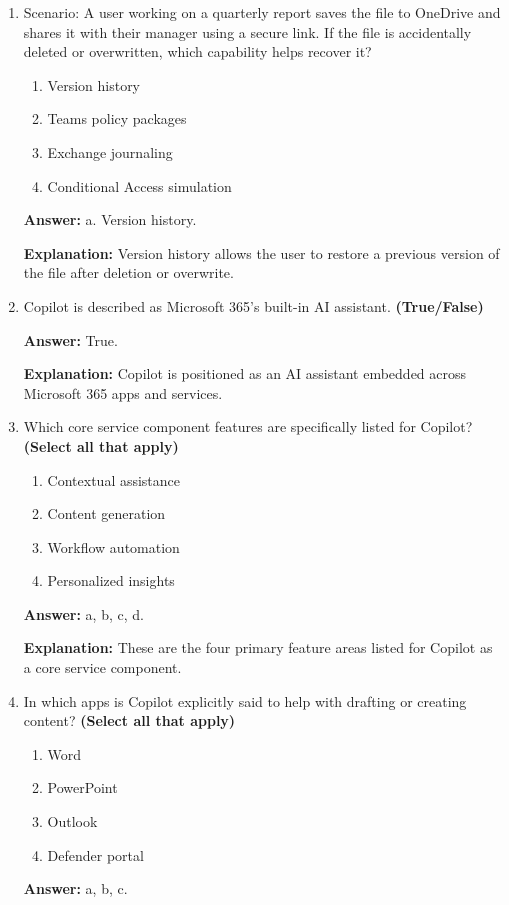 \documentclass[10pt]{article}
\begin{document}
\begin{enumerate}[leftmargin=*]
\textbf{Explanation:} OneDrive sharing can be constrained using permission levels, expirations, and password-protected links.

\item Scenario: A user working on a quarterly report saves the file to OneDrive and shares it with their manager using a secure link. If the file is accidentally deleted or overwritten, which capability helps recover it?
\begin{enumerate}[label=\alph*., leftmargin=1.5em]
\item Version history
\item Teams policy packages
\item Exchange journaling
\item Conditional Access simulation
\end{enumerate}
\textbf{Answer:} a. Version history.

\textbf{Explanation:} Version history allows the user to restore a previous version of the file after deletion or overwrite.

\item Copilot is described as Microsoft 365’s built-in AI assistant. \textbf{(True/False)}

\textbf{Answer:} True.

\textbf{Explanation:} Copilot is positioned as an AI assistant embedded across Microsoft 365 apps and services.

\item Which core service component features are specifically listed for Copilot? \textbf{(Select all that apply)}
\begin{enumerate}[label=\alph*., leftmargin=1.5em]
\item Contextual assistance
\item Content generation
\item Workflow automation
\item Personalized insights
\end{enumerate}
\textbf{Answer:} a, b, c, d.

\textbf{Explanation:} These are the four primary feature areas listed for Copilot as a core service component.

\item In which apps is Copilot explicitly said to help with drafting or creating content? \textbf{(Select all that apply)}
\begin{enumerate}[label=\alph*., leftmargin=1.5em]
\item Word
\item PowerPoint
\item Outlook
\item Defender portal
\end{enumerate}
\textbf{Answer:} a, b, c.


\end{enumerate}
\end{document}
